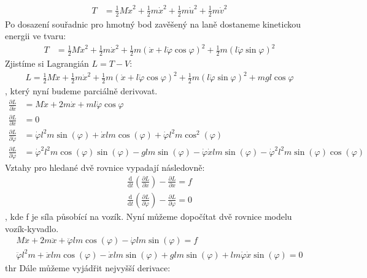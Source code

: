 \documentclass[a4paper, 12pt]{article}
\begin{document}
			\begin{align*}
				T &= \frac{1}{2}M\dot{x}^2+\frac{1}{2}m\dot{x}^2+\frac{1}{2}m\dot{u}^2+\frac{1}{2}m\dot{v}^2
			\end{align*}
			Po dosazení souřadnic pro hmotný bod zavěšený na laně dostaneme kinetickou energii ve tvaru:
			\begin{align*}
				T &= \frac{1}{2}M\dot{x}^2+\frac{1}{2}m\dot{x}^2+\frac{1}{2}m\left(\dot{x}+l\dot{\varphi}\cos\varphi\right)^2+\frac{1}{2}m\left(l\dot{\varphi}\sin\varphi\right)^2
			\end{align*}
			Zjistíme si Lagrangián $L = T - V$:
			\begin{align*}
				L = \frac{1}{2}M\dot{x}+\frac{1}{2}m\dot{x}^2+\frac{1}{2}m\left(\dot{x}+l\dot{\varphi}\cos\varphi\right)^2+\frac{1}{2}m\left(l\dot{\varphi}\sin\varphi\right)^2+mgl\cos\varphi
			\end{align*}
			, který nyní budeme parciálně derivovat.
			\begin{align*}
				\frac{\partial L}{\partial\dot{x}} &= M\dot{x}+2m\dot{x}+ml\dot{\varphi}\cos\varphi\\
				\frac{\partial L}{\partial x} &= 0\\
				\frac{\partial L}{\partial \dot{\varphi}} &= \dot{\varphi}l^2m\sin(\varphi)+\dot{x}lm\cos(\varphi)+\dot{\varphi}l^2m\cos^2(\varphi)\\
				\frac{\partial L}{\partial \varphi} &= \dot{\varphi}^2l^2m\cos(\varphi)\sin(\varphi)-glm\sin(\varphi)-\dot{\varphi}\dot{x}lm\sin(\varphi)-\dot{\varphi}^2l^2m\sin(\varphi)\cos(\varphi)
			\end{align*}
			Vztahy pro hledané dvě rovnice vypadají následovně:
			\begin{align*}
				\frac{\mathrm{d}}{\mathrm{d}t}\left(\frac{\partial L}{\partial \dot{x}}\right) - \frac{\partial L}{\partial x} = f\\
				\frac{\mathrm{d}}{\mathrm{d}t}\left(\frac{\partial L}{\partial \dot{\varphi}}\right) - \frac{\partial L}{\partial \varphi} = 0
			\end{align*}
			, kde f je síla působící na vozík. Nyní můžeme dopočítat dvě rovnice modelu vozík-kyvadlo.
			\begin{align*}
				M\ddot{x}+2m\ddot{x}+\ddot{\varphi}lm\cos(\varphi)-\dot{\varphi}lm\sin(\varphi) = f\\
				\ddot{\varphi}l^2m+\ddot{x}lm\cos(\varphi)-\dot{x}lm\sin(\varphi)+glm\sin(\varphi)+lm\dot{\varphi}\dot{x}\sin(\varphi)=0
			\end{align*}
thr			Dále můžeme vyjádřit nejvyšší derivace:
\end{document}

